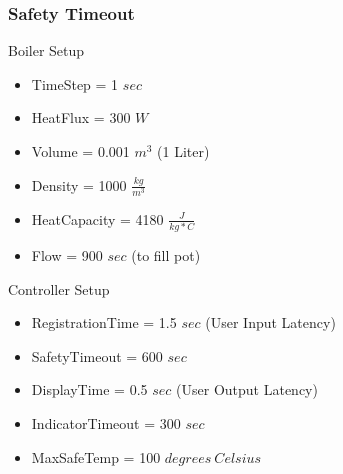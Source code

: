\documentclass[10pt]{article}
\begin{document}
\subsubsection{Safety Timeout}
\begin{multicols}{2}
Boiler Setup
\begin{itemize}
\item TimeStep = 1 $sec$
\item HeatFlux = 300 $W$
\item Volume = 0.001 $m^3$ (1 Liter)
\item Density = 1000 $\frac{kg}{m^3}$
\item HeatCapacity = 4180 $\frac{J}{kg*C}$
\item Flow = 900 $sec$ (to fill pot)
\end{itemize}

\columnbreak
Controller Setup
\begin{itemize}
\item RegistrationTime = 1.5 $sec$ (User Input Latency)
\item SafetyTimeout = 600 $sec$
\item DisplayTime = 0.5 $sec$ (User Output Latency)
\item IndicatorTimeout = 300 $sec$
\item MaxSafeTemp = 100 $degrees~Celsius$
\end{itemize}

\end{multicols}
\end{document}
